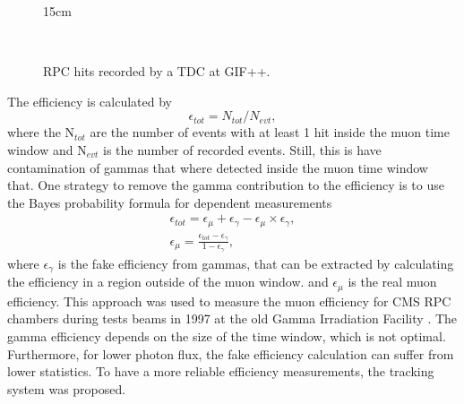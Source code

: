 \begin{figure}[!htm]{15cm}
  \caption{RPC hits recorded by a TDC at GIF++.} 
  \label{fig:RPC_hits_TDC}
  \hfill
  \\
\end{figure}

The efficiency is calculated by 
\begin{equation}
    \epsilon_{tot} = N_{tot}/N_{evt},
\end{equation}
where the N$_{tot}$ are the number of events with at least 1 hit inside the muon time window and N$_{evt}$ is the number of recorded events. Still, this is have contamination of gammas that where detected inside the muon time window that. One strategy to remove the gamma contribution to the efficiency is to use the Bayes probability formula for dependent measurements
\begin{eqnarray}
    \epsilon_{tot} = \epsilon_\mu + \epsilon_\gamma - \epsilon_\mu \times \epsilon_\gamma, \nonumber \\ 
    \epsilon_\mu = \frac{\epsilon_{tot} - \epsilon_\gamma}{1-\epsilon_\gamma},
\end{eqnarray}
where $\epsilon_\gamma$ is the fake efficiency from gammas, that can be extracted by calculating the efficiency in a region outside of the muon window. and $\epsilon_\mu$ is the real muon efficiency. This approach was used to measure the muon efficiency for CMS RPC chambers during tests beams in 1997 at the old Gamma Irradiation Facility \cite{Layter:343814}. The gamma efficiency depends on the size of the time window, which is not optimal. Furthermore, for lower photon flux, the fake efficiency calculation can suffer from lower statistics. To have a more reliable efficiency measurements, the tracking system was proposed.

